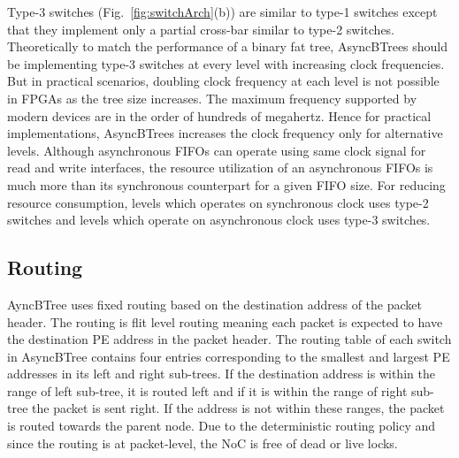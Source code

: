 Type-3 switches (Fig.~\ref{fig:switchArch}(b)) are similar to type-1 switches except that they implement only a partial cross-bar similar to type-2 switches.
Theoretically to match the performance of a binary fat tree, AsyncBTrees should be implementing type-3 switches at every level with increasing clock frequencies.
But in practical scenarios, doubling clock frequency at each level is not possible in FPGAs as the tree size increases.
The maximum frequency supported by modern devices are in the order of hundreds of megahertz.
Hence for practical implementations, AsyncBTrees increases the clock frequency only for alternative levels. 
Although asynchronous FIFOs can operate using same clock signal for read and write interfaces, the resource utilization of an asynchronous FIFOs is much more than its synchronous counterpart for a given FIFO size.
For reducing resource consumption, levels which operates on synchronous clock uses type-2 switches and levels which operate on asynchronous clock uses type-3 switches.

\subsection{Routing}
\label{sec:routing}
AyncBTree uses fixed routing based on the destination address of the packet header.
The routing is flit level routing meaning each packet is expected to have the destination PE address in the packet header.
The routing table of each switch in AsyncBTree contains four entries corresponding to the smallest and largest PE addresses in its left and right sub-trees.
If the destination address is within the range of left sub-tree, it is routed left and if it is within the range of right sub-tree the packet is sent right.
If the address is not within these ranges, the packet is routed towards the parent node.
Due to the deterministic routing policy and since the routing is at packet-level, the NoC is free of dead or live locks.

